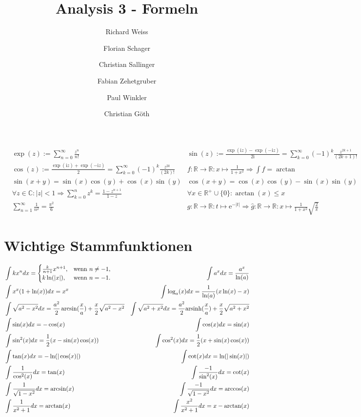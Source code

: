 \documentclass{article}
\title
{
  Analysis 3 - Formeln \\
  \vspace{4pt}
  \normalsize
  \textit{}
}
\author
{
  Richard Weiss       \and
  Florian Schager     \and
  Christian Sallinger \and
  Fabian Zehetgruber  \and
  Paul Winkler        \and
  Christian Göth
}
\date{}
\begin{document}
\maketitle

\begin{align*}
    &\exp(z) := \sum_{n=0}^\infty \frac{z^n}{n!} &  \sin(z) := \frac{\exp(\mathrm{i}z) - \exp(-\mathrm{i}z)}{2\mathrm{i}} = \sum_{k=0}^\infty (-1)^k \frac{z^{2k+1}}{(2k+1)!} \\
    &\cos(z) := \frac{\exp(\mathrm{i}z) + \exp(-\mathrm{i}z)}{2} = \sum_{k=0}^\infty (-1)^k \frac{z^{2k}}{(2k)!} &  f:\mathbb{R} \to \mathbb{R}: x \mapsto \frac{1}{1 + x^2} \Rightarrow \int f = \arctan  \\
    &\sin(x + y) = \sin(x)\cos(y) + \cos(x)\sin(y) & \cos(x + y) = \cos(x)\cos(y) - \sin(x)\sin(y) \\
    &\forall z \in \mathbb{C}: \vert z \vert < 1 \Rightarrow \sum_{k=0}^n z^k = \frac{1 - z^{n+1}}{1-z} &  \forall x \in \mathbb{R}^+\cup\{0\}: \arctan(x) \leq x \\
    &\sum_{n=1}^\infty \frac{1}{n^2} = \frac{\pi^2}{6} & g:\mathbb{R} \to \mathbb{R}: t \mapsto \mathrm{e}^{-\vert t \vert} \Rightarrow \hat{g}: \mathbb{R} \to \mathbb{R}: x \mapsto \frac{1}{1 + x^2} \sqrt{\frac{2}{\pi}}
\end{align*}
\section*{Wichtige Stammfunktionen}
\begin{align*}
  &\int kx^n dx = \begin{cases} \frac{k}{n+1}x^{n+1}, & \text{wenn } n \neq -1, \\
  k\ln (|x|), & \text{wenn } n = -1.
\end{cases}
 &\int a^x dx = \frac{a^x}{\ln (a)} \\
 &\int x^x(1+\ln(x)) dx = x^x
 &\int \log_a(x) dx = \frac{1}{\ln(a)}(x\ln(x) - x) \\
 &\int \sqrt{a^2-x^2} dx = \frac{a^2}{2}\arcsin(\frac{x}{a}) + \frac{x}{2}\sqrt{a^2-x^2}
 &\int \sqrt{a^2+x^2} dx = \frac{a^2}{2}\text{arsinh}(\frac{x}{a}) + \frac{x}{2}\sqrt{a^2+x^2} \\
 &\int \sin(x) dx = -\cos(x)
 &\int \cos(x) dx = \sin(x) \\
 &\int \sin^2(x) dx = \frac{1}{2}(x - \sin(x)\cos(x))
 &\int \cos^2(x) dx = \frac{1}{2}(x + \sin(x)\cos(x)) \\
 &\int \tan(x) dx = -\ln(|\cos(x)|)
 &\int \cot(x) dx = \ln(|\sin(x)|) \\
 &\int \frac{1}{\cos^2(x)} dx = \tan(x)
 &\int \frac{-1}{\sin^2(x)} dx = \cot(x) \\
 &\int \frac{1}{\sqrt{1-x^2}} dx = \arcsin(x)
 &\int \frac{-1}{\sqrt{1-x^2}} dx = \arccos(x) \\
 &\int \frac{1}{x^2 + 1} dx =  \arctan(x)
 &\int \frac{x^2}{x^2 + 1} dx = x - \arctan(x) \\
\end{align*}
\end{document}
